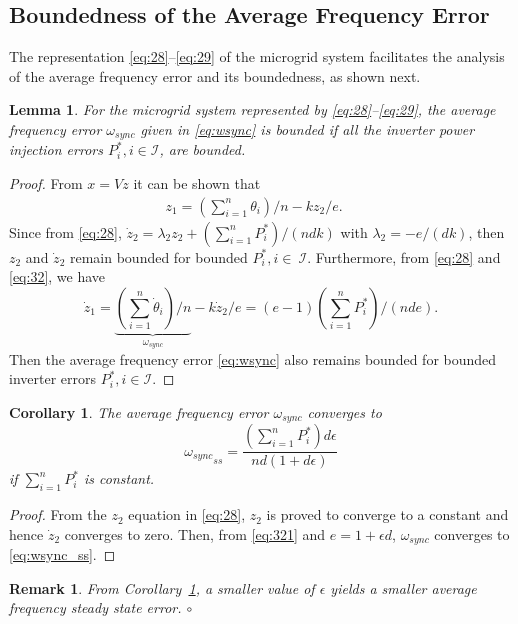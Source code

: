\documentclass[letter, 10pt, conference]{ieeeconf}
\newtheorem{lemma}[theorem]{Lemma}
\newtheorem{corollary}[theorem]{Corollary}
\newtheorem{remark}[theorem]{Remark}
\newcommand{\I}{\mathcal{I}}
\newcommand{\mer}{\hfill$\circ$}
\newcommand{\1}{\mathbf{1}}
\newcommand{\0}{\mathbf{0}}
\begin{document}
{\subsection{Boundedness of the Average Frequency Error}
\label{subsec:wsyncbndd}
The representation \eqref{eq:28}--\eqref{eq:29} of the microgrid
system facilitates the analysis of the average frequency error
and its boundedness, as shown next.
\begin{lemma}
  \label{lem:wsync_bndd}
  For the microgrid system represented by
  \eqref{eq:28}--\eqref{eq:29}, the average frequency error
  $\omega_{sync}$ given in \eqref{eq:wsync} is bounded if all the
  inverter power injection errors $P_i^*, i\in\I$, are bounded.
\end{lemma}
\begin{proof}
  From $x=V z$ it can be shown that 
  \begin{align}
  	\label{eq:32}
  	z_1 = (\sum_{i=1}^n \theta_i)/n - k z_2/e. \quad
\end{align}
  Since from \eqref{eq:28}, $\dot{z}_2=\lambda_2 z_2+(\sum_{i=1}^n P_i^*)/(ndk)$
  with $\lambda_2=-e/(dk)$, then $z_2$ and $\dot{z}_2$ remain bounded for 
  bounded $P_i^*,i\in~\I$. Furthermore, from \eqref{eq:28} and \eqref{eq:32},
  we have 
  \begin{equation}
  	\label{eq:321}
    \dot{z}_1=\underbrace{(\sum_{i=1}^n \dot{\theta}_i)/n}_{\omega_{sync}} 
    - k \dot{z}_2/e  =(e-1)(\sum_{i=1}^n P_i^*)/(nde).
  \end{equation}
  Then the average frequency error \eqref{eq:wsync} also
  remains bounded for bounded inverter errors $P_i^*,i\in\I$.
\end{proof}

\begin{corollary}
  \label{cor:wsync}
  The average frequency error $\omega_{sync}$ converges to
  \begin{equation}
  	\label{eq:wsync_ss}
  	{\omega_{sync}}_{ss}=\frac{(\sum_{i=1}^n P_i^*)d \epsilon}{nd(1+d\epsilon)}
  \end{equation}
  if $\sum_{i=1}^n P_i^*$ is constant.  
\end{corollary}
\begin{proof}
  From the $z_2$ equation in \eqref{eq:28}, $z_2$ is proved to converge to 
  a constant and hence $\dot{z}_2$ converges to zero. Then, from
  \eqref{eq:321} and $e=1+\epsilon d$, $\omega_{sync}$ converges to 
  \eqref{eq:wsync_ss}.
\end{proof}

\begin{remark}
  From Corollary~\ref{cor:wsync}, a smaller value of $\epsilon$
  yields a smaller average frequency steady state error.
  \mer
\end{remark}

}
\end{document}
